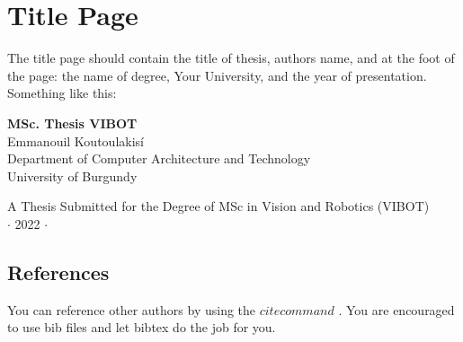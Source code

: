 \section{Title Page}
The title page should contain the title of thesis, authors name,
and at the foot of the page: the name of degree,  Your University,
and the year of presentation. Something like this:

\vspace*{1cm}
\begin{center}
{\Large\bf MSc. Thesis VIBOT\\} \vspace{2cm} {\large
Emmanouil Koutoulakis\'i\\
\vspace{1cm}
Department of Computer Architecture and Technology \\
University of Burgundy}

\end{center}

\vspace{2cm}
\begin{center}
{\large A Thesis Submitted for the Degree of MSc in
Vision and Robotics (VIBOT)\\ \vspace{0.3cm} $\cdot$ 2022 $\cdot$}
\end{center}


\subsection{References}
You can reference other authors by using the $cite command$
\cite{Pokorski:1998hr}. You are encouraged to use bib files and
let bibtex do the job for you.